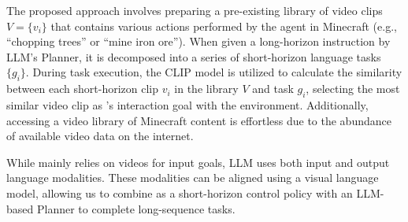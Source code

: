 \documentclass[11pt, a4paper, logo, one column]{craftjarvis}
\begin{document}
The proposed approach involves preparing a pre-existing library of video clips $V = \{v_i\}$ that contains various actions performed by the agent in Minecraft (e.g., ``chopping trees'' or ``mine iron ore''). When given a long-horizon instruction by LLM's Planner, it is decomposed into a series of short-horizon language tasks $\{g_i\}$. During task execution, the CLIP model is utilized to calculate the similarity between each short-horizon clip ${v_i}$ in the library $V$ and task $g_i$, selecting the most similar video clip as \agent's interaction goal with the environment. Additionally, accessing a video library of Minecraft content is effortless due to the abundance of available video data on the internet. 

While \agent mainly relies on videos for input goals, LLM uses both input and output language modalities. These modalities can be aligned using a visual language model, allowing us to combine \agent as a short-horizon control policy with an LLM-based Planner to complete long-sequence tasks. 
\end{document}
